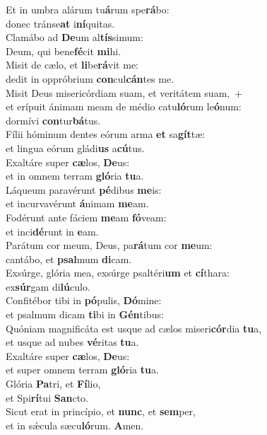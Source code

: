 \evenverse Et in umbra alárum tu\textbf{á}rum spe\textbf{rá}bo:~\*\\
\evenverse donec tránse\textbf{at} i\textbf{ní}quitas.\\
\oddverse Clamábo ad \textbf{De}um al\textbf{tís}simum:~\*\\
\oddverse Deum, qui bene\textbf{fé}cit \textbf{mi}hi.\\
\evenverse Misit de cælo, et \textbf{li}be\textbf{rá}vit me:~\*\\
\evenverse dedit in oppróbrium \textbf{con}cul\textbf{cán}tes me.\\
\oddverse Misit Deus misericórdiam suam, et veritátem suam,~+\\
\oddverse  et erípuit ánimam meam de médio catu\textbf{ló}rum le\textbf{ó}num:~\*\\
\oddverse dormívi \textbf{con}tur\textbf{bá}tus.\\
\evenverse Fílii hóminum dentes eórum arma \textbf{et} sa\textbf{gít}tæ:~\*\\
\evenverse et lingua eórum gládi\textbf{us} a\textbf{cú}tus.\\
\oddverse Exaltáre super \textbf{cæ}los, \textbf{De}us:~\*\\
\oddverse et in omnem terram \textbf{gló}ria \textbf{tu}a.\\
\evenverse Láqueum paravérunt \textbf{pé}dibus \textbf{me}is:~\*\\
\evenverse et incurvavérunt \textbf{á}nimam \textbf{me}am.\\
\oddverse Fodérunt ante fáciem \textbf{me}am \textbf{fó}veam:~\*\\
\oddverse et inci\textbf{dé}runt in \textbf{e}am.\\
\evenverse Parátum cor meum, Deus, pa\textbf{rá}tum cor \textbf{me}um:~\*\\
\evenverse cantábo, et \textbf{psal}mum \textbf{di}cam.\\
\oddverse Exsúrge, glória mea, exsúrge psaltéri\textbf{um} et \textbf{cí}thara:~\*\\
\oddverse ex\textbf{súr}gam di\textbf{lú}culo.\\
\evenverse Confitébor tibi in \textbf{pó}pulis, \textbf{Dó}mine:~\*\\
\evenverse et psalmum dicam \textbf{ti}bi in \textbf{Gén}tibus:\\
\oddverse Quóniam magnificáta est usque ad cælos miseri\textbf{cór}dia \textbf{tu}a,~\*\\
\oddverse et usque ad nubes \textbf{vé}ritas \textbf{tu}a.\\
\evenverse Exaltáre super \textbf{cæ}los, \textbf{De}us:~\*\\
\evenverse et super omnem terram \textbf{gló}ria \textbf{tu}a.\\
\oddverse Glória \textbf{Pa}tri, et \textbf{Fí}lio,~\*\\
\oddverse et Spi\textbf{rí}tui \textbf{San}cto.\\
\evenverse Sicut erat in princípio, et \textbf{nunc}, et \textbf{sem}per,~\*\\
\evenverse et in sǽcula sæcu\textbf{ló}rum. \textbf{A}men.\\
